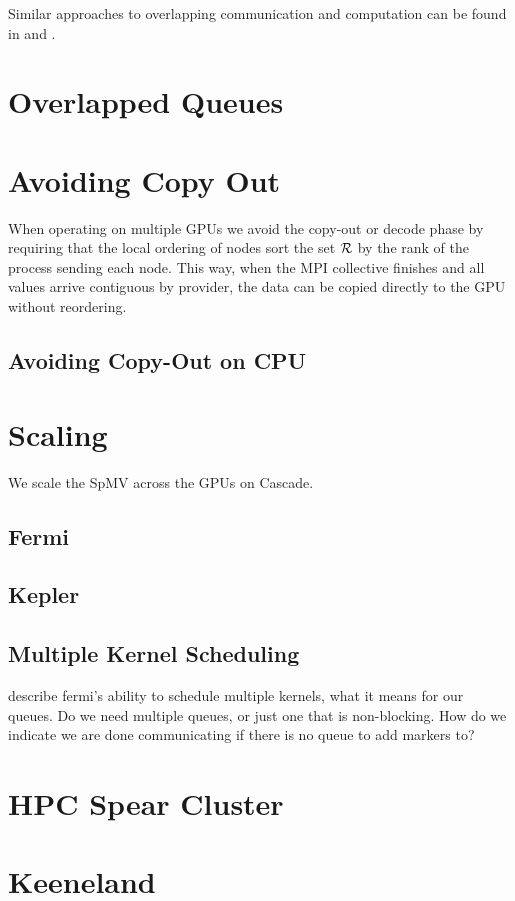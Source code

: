 \documentclass{report}
\begin{document}
Similar approaches to overlapping communication and computation can be found in \cite{Schubert2011} and \cite{Thibault2009}.

\section{Overlapped Queues}

\section{Avoiding Copy Out}
When operating on multiple GPUs we avoid the copy-out or decode phase by requiring that the local ordering of nodes sort the set $\mathcal{R}$ by the rank of the process sending each node. This way, when the MPI collective finishes and all values arrive contiguous by provider, the data can be copied directly to the GPU without reordering.




\subsection{Avoiding Copy-Out on CPU}

\section{Scaling}
We scale the SpMV across the GPUs on Cascade.

\subsection{Fermi}
\subsection{Kepler}
\subsection{Multiple Kernel Scheduling}
describe fermi's ability to schedule multiple kernels, what it means for our queues. Do we need multiple queues, or just one that is non-blocking. How do we indicate we are done communicating if there is no queue to add markers to? 


\section{HPC Spear Cluster} 

\section{Keeneland}
\end{document}

